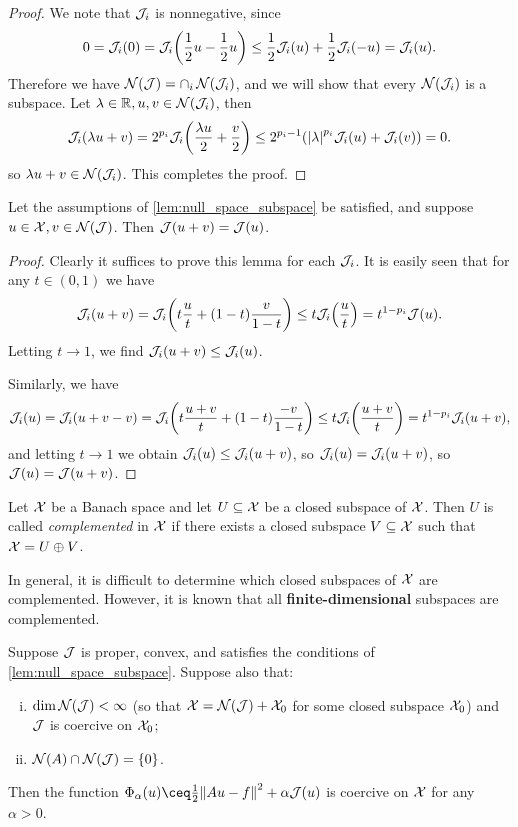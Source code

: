 \begin{proof}
	We note that $\mathcal J_i$ is nonnegative, since
	\[
	0 = \mathcal J_i(0) = \mathcal J_i\qty(\frac12 u - \frac12 u) \leq \frac12\mathcal J_i(u) + \frac12\mathcal J_i(-u) = \mathcal J_i(u).
	\]
	Therefore we have $\operatorname{\mathcal N}(\mathcal J) = \cap_i \operatorname{\mathcal N}(\mathcal J_i)$, and we will show that every $\operatorname{\mathcal N}(\mathcal J_i)$ is a subspace. Let $\lambda \in \mathbb R, u, v \in \operatorname{\mathcal N}(\mathcal J_i)$, then 
	\[
	\mathcal J_i(\lambda u + v) = 2^{p_i} \mathcal J_i\qty(\frac{\lambda u}{2} + \frac v2) \leq 2^{p_i - 1} \qty(\abs{\lambda}^{p_i} \mathcal J_i(u) + \mathcal J_i(v)) = 0. 
	\]
	so $\lambda u + v \in \operatorname{\mathcal N}(\mathcal J_i)$. This completes the proof. 
\end{proof}

\begin{lemma}
	Let the assumptions of \cref{lem:null_space_subspace} be satisfied, and suppose $u \in \mathcal X, v \in \operatorname{\mathcal N}(\mathcal J)$. Then $\mathcal J(u + v) = \mathcal J(u)$. 
\end{lemma}

\begin{proof}
	Clearly it suffices to prove this lemma for each $\mathcal J_i$. It is easily seen that for any $t \in (0, 1)$ we have
	\[
	\mathcal J_i(u + v) = \mathcal J_i \qty(t \frac ut + (1-t) \frac{v}{1-t}) \leq t \mathcal J_i \qty(\frac ut) = t^{1 - p_i} \mathcal J(u). 
	\]
	Letting $t \to 1$, we find $\mathcal J_i(u + v) \leq \mathcal J_i(u)$. 
	
	Similarly, we have
	\[
	\mathcal J_i(u) = \mathcal J_i(u + v - v) = \mathcal J_i \qty(t \frac{ u+ v}{t} + (1-t) \frac{-v}{1-t}) \leq t \mathcal J_i\qty(\frac{u+ v}{t}) = t^{1 - p_i} \mathcal J_i(u + v), 
	\]
	and letting $t \to 1$ we obtain $\mathcal J_i(u) \leq \mathcal J_i(u+v)$, so $\mathcal J_i(u) = \mathcal J_i(u+v)$, so $\mathcal J(u) = \mathcal J(u + v)$. 
\end{proof}

\begin{recap}
	Let $\mathcal X$ be a Banach space and let $U \subseteq \mathcal X$ be a closed subspace of $\mathcal X$. Then $U$ is called \emph{complemented} in $\mathcal X$ if there exists a closed subspace $V \subseteq \mathcal X$ such that $\mathcal X = U \oplus V$. 
	
	In general, it is difficult to determine which closed subspaces of $\mathcal X$ are complemented. However, it is known that all \textbf{finite-dimensional} subspaces are complemented. 
\end{recap}
\begin{lemma} \label{lem:regulariser_coercive}
	Suppose $\mathcal J$ is proper, convex, and satisfies the conditions of \cref{lem:null_space_subspace}. Suppose also that:
	\begin{enumerate}[(i)]
		\item $\dim \operatorname{\mathcal N}(\mathcal J) < \infty$ (so that $\mathcal X = \operatorname{\mathcal N}(\mathcal J) + \mathcal X_0$ for some closed subspace $\mathcal X_0$) and $\mathcal J$ is coercive on $\mathcal X_0$;
		\item $\operatorname{\mathcal N}(A) \cap \operatorname{\mathcal N}(\mathcal J) = \qty{0}$. 
	\end{enumerate}

Then the function $\Phi_\alpha(u) \ceq \frac12\norm{Au - f}^2 + \alpha \JJ(u)$ is coercive on $\mathcal X$ for any $\alpha > 0$. 
\end{lemma}

